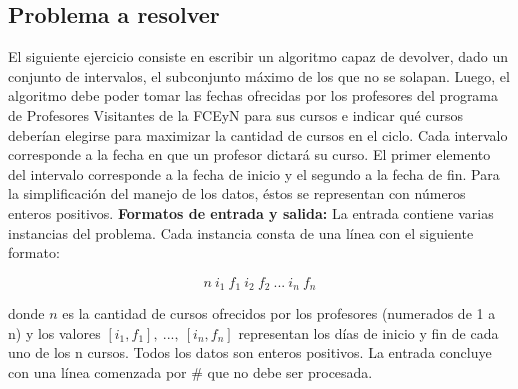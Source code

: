 \subsection{Problema a resolver}
El siguiente ejercicio consiste en escribir un algoritmo capaz de devolver, dado un conjunto de intervalos, el subconjunto máximo de los que no se solapan. Luego, el algoritmo debe poder tomar las fechas ofrecidas por los profesores del programa de Profesores Visitantes de la FCEyN para sus cursos e indicar qué cursos deberían elegirse para maximizar la cantidad de cursos en el ciclo. Cada intervalo corresponde a la fecha en que un profesor  dictará su curso. El primer elemento del intervalo corresponde a la fecha de inicio y el segundo a la fecha de fin. Para la simplificación del manejo de los datos, éstos se representan con números enteros positivos.\newline
\newline
\textbf {Formatos de entrada y salida:}\newline
\newline
La entrada contiene varias instancias del problema. Cada instancia consta de una línea con el siguiente formato:

$$n\ i_{1}\ f_{1}\ i_{2}\ f_{2}\ ...\ i_{n}\ f_{n}$$


donde \textbf{$n$} es la cantidad de cursos ofrecidos por los profesores (numerados de 1 a n) y los valores \textbf{$[i_{1},f_{1}],\ ...,\ [i_{n},f_{n}]$} representan los días de inicio y fin de cada uno de los n cursos. Todos los datos son enteros positivos. La entrada concluye con una línea comenzada por \# que no debe ser procesada.\newline

